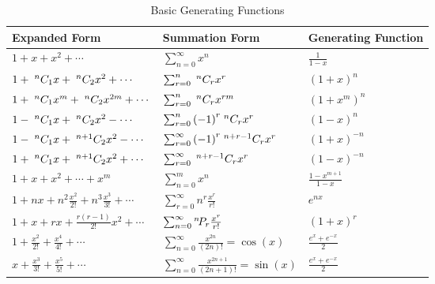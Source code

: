 \begin{table}[h]
    \renewcommand{\arraystretch}{1.5}
    \centering
    \begin{tabularx}{\textwidth}{Xll}
        \toprule
        \textbf{Expanded Form}                                        & \textbf{Summation Form}                                       & \textbf{Generating Function}   \\
        \midrule
        \mbox{$1+x+x^2+\cdots$}                                       & \mbox{$\sum_{n=0}^{\infty} x^n$}                              & \mbox{$\frac{1}{1-x}$}         \\
        \mbox{$1 + \;{}^{n}C_{1}x + \;{}^{n}C_{2}x^2 + \cdots $}      & \mbox{$\sum_{r=0}^{n} \;{}^{n}C_{r} x^r$}                     & \mbox{${(1+x)}^n$}             \\
        \mbox{$1 + \;{}^{n}C_{1}x^m + \;{}^{n}C_{2}x^{2m} + \cdots $} & \mbox{$\sum_{r=0}^{n} \;{}^{n}C_{r} x^{rm}$}                  & \mbox{${(1+x^m)}^{n}$}         \\
        \mbox{$1 - \;{}^{n}C_{1}x + \;{}^{n}C_{2}x^2 - \cdots $}      & \mbox{$\sum_{r=0}^{n} {(-1)}^r \;{}^{n}C_{r} x^r$}            & \mbox{${(1-x)}^n$}             \\
        \mbox{$1 - \;{}^{n}C_{1}x + \;{}^{n+1}C_{2}x^2 - \cdots$}     & \mbox{$\sum_{r=0}^{\infty} {(-1)}^r \;{}^{n+r-1}C_{r} x^r$}   & \mbox{${(1+x)}^{-n}$}          \\
        \mbox{$1 + \;{}^{n}C_{1}x + \;{}^{n+1}C_{2}x^2 + \cdots$}     & \mbox{$\sum_{r=0}^{\infty} \;{}^{n+r-1}C_{r} x^r$}            & \mbox{${(1-x)}^{-n}$}          \\
        \mbox{$1+x+x^2+\cdots+x^m$}                                   & \mbox{$\sum_{n=0}^{m} x^n$}                                   & \mbox{$\frac{1-x^{m+1}}{1-x}$} \\
        \mbox{$1+nx+n^2\frac{x^2}{2!}+n^3\frac{x^3}{3!}+\cdots$}      & \mbox{$\sum_{r=0}^{\infty} n^r \frac{x^r}{r!}$}               & \mbox{$e^{nx}$}                \\
        \mbox{$1+x+rx+\frac{r(r-1)}{2!}x^2+\cdots$}                   & \mbox{$\sum_{n=0}^{\infty} {}^{n}\!P_{r} \frac{x^r}{r!}$}       & \mbox{${(1+x)}^r$}             \\
        \mbox{$1+\frac{x^2}{2!}+\frac{x^4}{4!}+\cdots$}               & \mbox{$\sum_{n=0}^{\infty} \frac{x^{2n}}{(2n)!}=\cos(x)$}     & \mbox{$\frac{e^x+e^{-x}}{2}$}  \\
        \mbox{$x+\frac{x^3}{3!}+\frac{x^5}{5!}+\cdots$}               & \mbox{$\sum_{n=0}^{\infty} \frac{x^{2n+1}}{(2n+1)!}=\sin(x)$} & \mbox{$\frac{e^x+e^{-x}}{2}$}  \\
        \bottomrule
    \end{tabularx}
    \caption{Basic Generating Functions}\label{tab:basic_generating_functions}
\end{table}


